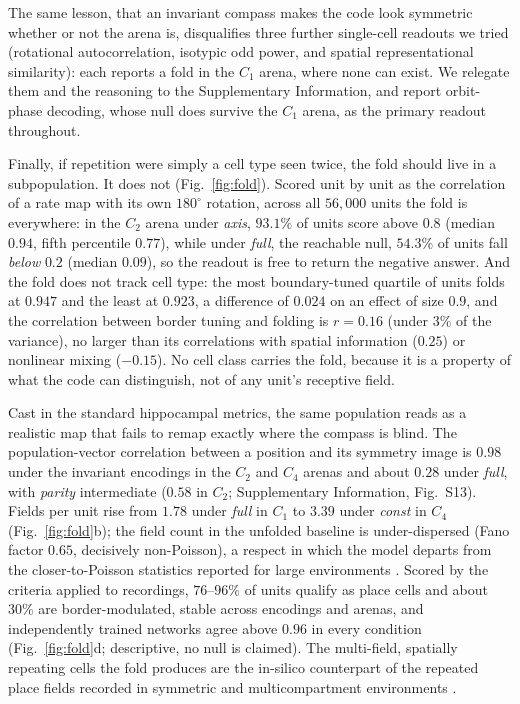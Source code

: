 The same lesson, that an invariant compass makes the code look symmetric whether or not the arena is,
disqualifies three further single-cell readouts we tried (rotational autocorrelation, isotypic odd
power, and spatial representational similarity): each reports a fold in the $C_1$ arena, where none can
exist. We relegate them and the reasoning to the Supplementary Information, and report orbit-phase
decoding, whose null does survive the $C_1$ arena, as the primary readout throughout.

Finally, if repetition were simply a cell type seen twice, the fold should live in a subpopulation. It
does not (Fig.~\ref{fig:fold}). Scored unit by unit as the correlation of a rate map with its own
$180^\circ$ rotation, across all $56{,}000$ units the fold is everywhere: in the $C_2$ arena under
\textit{axis}, $93.1\%$ of units score above $0.8$ (median $0.94$, fifth percentile $0.77$), while under
\textit{full}, the reachable null, $54.3\%$ of units fall \emph{below} $0.2$ (median $0.09$), so the
readout is free to return the negative answer. And the fold does not track cell type: the most
boundary-tuned quartile of units folds at $0.947$ and the least at $0.923$, a difference of $0.024$ on an
effect of size $0.9$, and the correlation between border tuning and folding is $r = 0.16$ (under $3\%$ of
the variance), no larger than its correlations with spatial information ($0.25$) or nonlinear mixing
($-0.15$). No cell class carries the fold, because it is a property of what the code can distinguish, not
of any unit's receptive field.

Cast in the standard hippocampal metrics, the same population reads as a realistic map that fails to
remap exactly where the compass is blind. The population-vector correlation \citep{leutgeb2005} between a
position and its symmetry image is $0.98$ under the invariant encodings in the $C_2$ and $C_4$ arenas
and about $0.28$ under \textit{full}, with \textit{parity} intermediate ($0.58$ in $C_2$;
Supplementary Information, Fig.~S13). Fields per
unit rise from $1.78$ under \textit{full} in $C_1$ to $3.39$ under \textit{const} in $C_4$ (Fig.~\ref{fig:fold}b); the field
count in the unfolded baseline is under-dispersed (Fano factor $0.65$, decisively non-Poisson), a
respect in which the model departs from the closer-to-Poisson statistics reported for large environments
\citep{rich2014}. Scored by the criteria applied to recordings, $76$--$96\%$ of units qualify as place
cells and about $30\%$ are border-modulated, stable across encodings and arenas, and independently
trained networks agree above $0.96$ in every condition (Fig.~\ref{fig:fold}d; descriptive, no null is claimed). The
multi-field, spatially repeating cells the fold produces are the in-silico counterpart of the repeated
place fields recorded in symmetric and multicompartment environments \citep{grieves2016, derdikman2009}.

